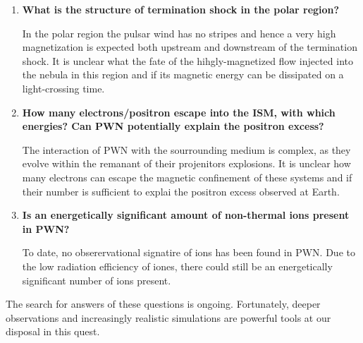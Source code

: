 \begin{enumerate}
\item \textbf{What is the structure of termination shock in the polar region? }

In the polar region the pulsar wind has no stripes and hence a very high magnetization is expected both upstream and downstream of the termination shock. It is unclear what the fate of the hihgly-magnetized flow injected into the nebula in this region and if its magnetic energy can be dissipated on a light-crossing time.

\item \textbf{How many electrons/positron escape into the ISM, with which energies? Can PWN potentially explain the positron excess?}

The interaction of PWN with the sourrounding medium is complex, as they evolve within the remanant of their projenitors explosions. It is unclear how many electrons can escape the magnetic confinement of these systems and if their number is sufficient to explai the positron excess observed at Earth.

\item \textbf{Is an energetically significant amount of non-thermal  ions present in PWN?}

To date, no obserervational signatire of ions has been found in PWN. Due to the low radiation efficiency of iones, there could still be an energetically significant number of ions present.

\end{enumerate}

The search for answers of these questions is ongoing. Fortunately, deeper observations and increasingly realistic simulations are powerful tools at our disposal in this quest.
